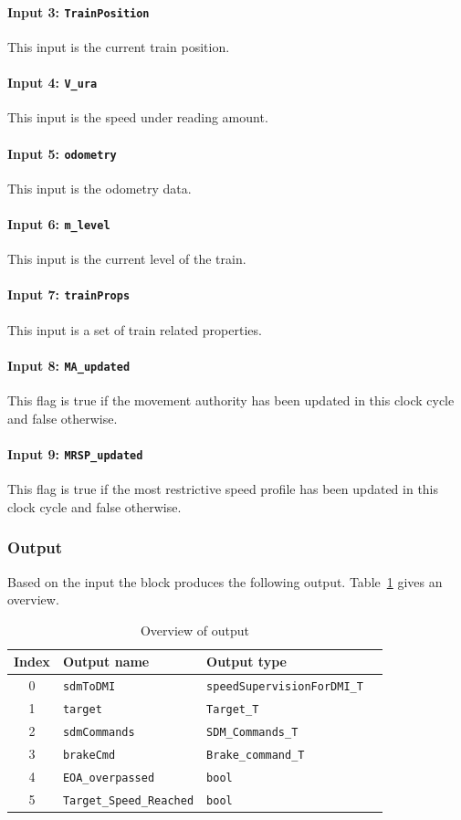 \paragraph{Input 3: \texttt{TrainPosition}}
This input is the current train position.
\paragraph{Input 4: \texttt{V\_ura}}
This input is the speed under reading amount.
\paragraph{Input 5: \texttt{odometry}}
This input is the odometry data.
\paragraph{Input 6: \texttt{m\_level}}
This input is the current level of the train.
\paragraph{Input 7: \texttt{trainProps}}
This input is a set of train related properties.
\paragraph{Input 8: \texttt{MA\_updated}}
This flag is true if the movement authority has been updated in this clock cycle and false otherwise.
\paragraph{Input 9: \texttt{MRSP\_updated}}
This flag is true if the most restrictive speed profile has been updated in this clock cycle and false otherwise.



\subsubsection{Output}
Based on the input the block produces the following output. Table~\ref{tbl:speedsupervisionOutput} gives an overview.

\begin{table}[H]
  \begin{tabular}{| c | l | l | l |}
    \hline
    \textbf{Index} & \textbf{Output name} & \textbf{Output type}\\ \hline
    0 & \texttt{sdmToDMI} & \texttt{speedSupervisionForDMI\_T}\\
    1 & \texttt{target} & \texttt{Target\_T}\\
    2 & \texttt{sdmCommands} & \texttt{SDM\_Commands\_T}\\
    3 & \texttt{brakeCmd} & \texttt{Brake\_command\_T}\\
    4 & \texttt{EOA\_overpassed} & \texttt{bool}\\
    5 & \texttt{Target\_Speed\_Reached} & \texttt{bool}\\
    \hline
  \end{tabular} 
  \caption{Overview of output}
  \label{tbl:speedsupervisionOutput}
\end{table}

